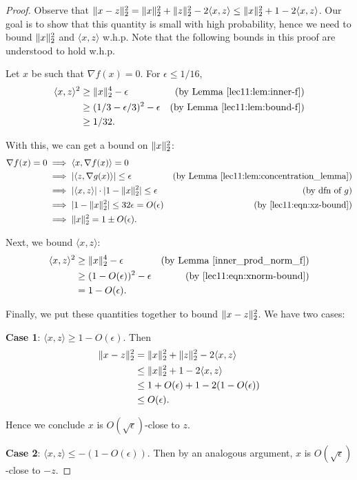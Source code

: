 \begin{proof}
Observe that $\|x-z\|_2^2 = \|x\|_2^2 + \|z\|_2^2 - 2\langle x,z \rangle \leq \|x\|_2^2 + 1 - 2\langle x,z \rangle$. Our goal is to show that this quantity is small with high probability, hence we need to bound $\|x\|_2^2$ and $\langle x,z \rangle$ w.h.p. Note that the following bounds in this proof are understood to hold w.h.p.
    
Let $x$ be such that $\nabla f(x) = 0$. For $\epsilon \leq 1/16$,
\begin{align}
\langle x,z \rangle^2 &\geq \|x\|_2^4 - \epsilon &\text{(by Lemma~\ref{lec11:lem:inner-f})} \\
&\geq (1/3-\epsilon/3)^2 - \epsilon &\text{(by Lemma~\ref{lec11:lem:bound-f})} \\
&\geq 1/32. \label{lec11:eqn:xz-bound}
\end{align}

With this, we can get a bound on $\|x\|_2^2$:
\begin{align}
\nabla f(x) = 0 &\implies \langle x, \nabla f(x) \rangle = 0 \\
&\implies |\langle z, \nabla g(x) \rangle| \leq \epsilon & \text{(by Lemma \ref{lec11:lem:concentration_lemma})} \\
&\implies |\langle x,z\rangle| \cdot |1-\|x\|_2^2| \leq \epsilon &\text{(by dfn of $g$)} \\
&\implies |1-\|x\|_2^2| \leq 32\epsilon = O(\epsilon) &\text{(by \eqref{lec11:eqn:xz-bound})} \\
&\implies \|x\|_2^2 = 1 \pm O(\epsilon). \label{lec11:eqn:xnorm-bound}
\end{align}
    
Next, we bound $\langle x,z \rangle$:
\begin{align}
\langle x, z \rangle^2 &\geq \|x\|_2^4 - \epsilon &\text{(by Lemma \ref{inner_prod_norm_f})} \\
&\geq (1-O(\epsilon))^2 - \epsilon &\text{(by \eqref{lec11:eqn:xnorm-bound})} \\
&= 1 - O(\epsilon).
\end{align}

Finally, we put these quantities together to bound $\|x-z\|_2^2$. We have two cases:
    
\textbf{Case 1}: $\langle x,z\rangle \geq 1 - O(\epsilon)$. Then
\begin{align}
\|x-z\|_2^2 &= \|x\|_2^2 + \|z\|_2^2 - 2\langle x,z \rangle \\
&\leq \|x\|_2^2 + 1 - 2\langle x,z \rangle \\
&\leq 1 + O(\epsilon) + 1 - 2(1-O(\epsilon)) \\
&\leq O(\epsilon).
\end{align} 
    
Hence we conclude $x$ is $O(\sqrt{\epsilon})$-close to $z$.
    
\textbf{Case 2}: $\langle x,z\rangle \leq -(1 - O(\epsilon))$. Then by an analogous argument, $x$ is $O(\sqrt{\epsilon})$-close to $-z$.
\end{proof}

